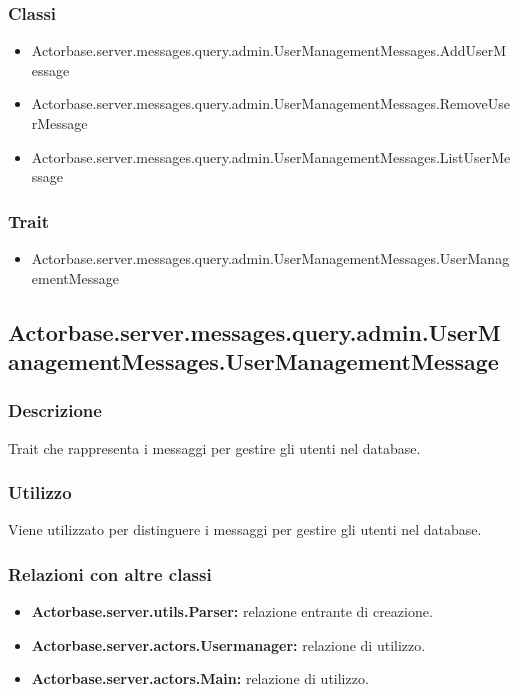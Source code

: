 \documentclass[a4paper]{article}
\begin{document}
			\subsubsection{Classi}
				\begin{itemize}
					\item Actorbase.server.messages.query.admin.UserManagementMessages.AddUserMessage
					\item Actorbase.server.messages.query.admin.UserManagementMessages.RemoveUserMessage
					\item Actorbase.server.messages.query.admin.UserManagementMessages.ListUserMessage
				\end{itemize}
				
			\subsubsection{Trait}
				\begin{itemize}
					\item Actorbase.server.messages.query.admin.UserManagementMessages.UserManagementMessage
				\end{itemize}
				
		\subsection{Actorbase.server.messages.query.admin.UserManagementMessages.UserManagementMessage}
			\subsubsection{Descrizione}
				Trait che rappresenta i messaggi per gestire gli utenti nel database.
				
			\subsubsection{Utilizzo}
				Viene utilizzato per distinguere i messaggi per gestire gli utenti nel database.
				
			\subsubsection{Relazioni con altre classi}
				\begin{itemize}
					\item \textbf{Actorbase.server.utils.Parser:} relazione entrante di creazione.
					\item \textbf{Actorbase.server.actors.Usermanager:} relazione di utilizzo.
					\item \textbf{Actorbase.server.actors.Main:} relazione di utilizzo.
				\end{itemize}
\end{document}
